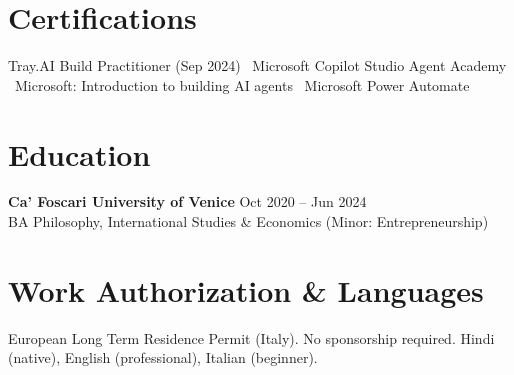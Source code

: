 \documentclass[a4paper,10pt]{article}
\begin{document}
\section{Certifications}
Tray.AI Build Practitioner (Sep 2024) \textbullet\ Microsoft Copilot Studio Agent Academy \textbullet\ Microsoft: Introduction to building AI agents \textbullet\ Microsoft Power Automate

\section{Education}
\textbf{Ca' Foscari University of Venice} \hfill Oct 2020 -- Jun 2024\\
BA Philosophy, International Studies \& Economics (Minor: Entrepreneurship)

\section{Work Authorization \& Languages}
European Long Term Residence Permit (Italy). No sponsorship required. Hindi (native), English (professional), Italian (beginner).
\end{document}
